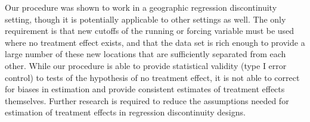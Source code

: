 \documentclass[a4paper,11pt]{article}
\begin{document}
Our procedure was shown to work in a geographic regression discontinuity setting, though it is potentially applicable to other settings as well. The only requirement is that new cutoffs of the running or forcing variable must be used where no treatment effect exists, and that the data set is rich enough to provide a large number of these new locations that are sufficiently separated from each other. While our procedure is able to provide statistical validity (type I error control) to tests of the hypothesis of no treatment effect, it is not able to correct for biases in estimation and provide consistent estimates of treatment effects themselves. Further research is required to reduce the assumptions needed for estimation of treatment effects in regression discontinuity designs.



\end{document}
